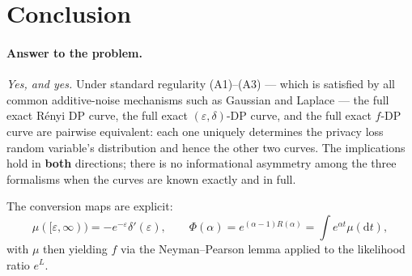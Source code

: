 \documentclass[11pt]{article}
\begin{document}
\section{Conclusion}

\paragraph{Answer to the problem.} \emph{Yes, and yes.} Under standard regularity (A1)--(A3) --- which is satisfied by all common additive-noise mechanisms such as Gaussian and Laplace --- the full exact R\'enyi DP curve, the full exact $(\varepsilon,\delta)$-DP curve, and the full exact $f$-DP curve are pairwise equivalent: each one uniquely determines the privacy loss random variable's distribution and hence the other two curves. The implications hold in \textbf{both} directions; there is no informational asymmetry among the three formalisms when the curves are known exactly and in full.

The conversion maps are explicit:
\[
\mu([\varepsilon,\infty)) = -e^{-\varepsilon}\delta'(\varepsilon), \qquad \Phi(\alpha) = e^{(\alpha-1)R(\alpha)} = \int e^{\alpha t}\mu(\mathrm{d}t),
\]
with $\mu$ then yielding $f$ via the Neyman--Pearson lemma applied to the likelihood ratio $e^L$.
\end{document}

